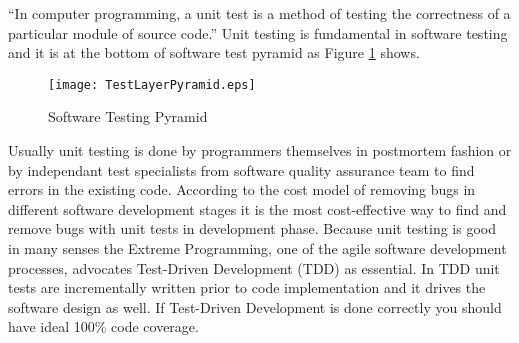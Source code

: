 \documentclass[11pt,twocolumn]{article}
\begin{document}
\begin{abstract}
\end{abstract}


\label{sec:intro}
  
``In computer programming, a unit test is a method of testing the
  correctness of a particular module of source code.'' \cite{UnitTestWiki}
 Unit testing is fundamental in software testing and it is at the bottom
 of software test pyramid as Figure  \ref{fig:TestLayer} shows.

  \begin{figure}[ht] 
    \centering
    \texttt{[image: TestLayerPyramid.eps]}
    \caption{Software Testing Pyramid}\label{fig:TestLayer}
  \end{figure} 
 
  Usually unit testing is done by programmers themselves in postmortem
  fashion or by independant test specialists from software quality
  assurance team to find errors in the existing code. According to the cost
  model of removing bugs in different software development stages it is the
  most cost-effective way to find and remove bugs with unit tests in
  development phase. Because unit testing is good in many senses the Extreme
  Programming, one of the agile software development processes, advocates
  Test-Driven Development (TDD) as essential. In TDD unit tests are
  incrementally written prior to code implementation \cite{George:2003} and
  it drives the software design as well. If Test-Driven Development is done
  correctly you should have ideal 100\% code coverage.
  
\end{document}

